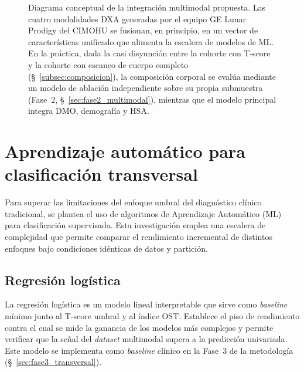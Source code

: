 \documentclass[../tesis.tex]{subfiles}
\begin{document}
\begin{figure}[h]
\caption[Diagrama conceptual de la integración multimodal propuesta]{Diagrama conceptual de la integración multimodal propuesta. Las cuatro modalidades DXA generadas por el equipo GE Lunar Prodigy del CIMOHU se fusionan, en principio, en un vector de características unificado que alimenta la escalera de modelos de ML. En la práctica, dada la casi disyunción entre la cohorte con T-score y la cohorte con escaneo de cuerpo completo (§~\ref{subsec:composicion}), la composición corporal se evalúa mediante un modelo de ablación independiente sobre su propia submuestra (Fase~2, §~\ref{sec:fase2_multimodal}), mientras que el modelo principal integra DMO, demografía y HSA.}
\label{fig:multimodal}
\end{figure}

\section{Aprendizaje automático para clasificación transversal}
\label{sec:ml_transversal}

Para superar las limitaciones del enfoque umbral del diagnóstico clínico tradicional, se plantea
el uso de algoritmos de Aprendizaje Automático (ML) para clasificación supervisada.
Esta investigación emplea una escalera de complejidad que permite comparar el rendimiento
incremental de distintos enfoques bajo condiciones idénticas de datos y partición.

\subsection{Regresión logística}
\label{subsec:logistic}

La regresión logística es un modelo lineal interpretable que sirve como \textit{baseline} mínimo
junto al T-score umbral y al índice OST\@.
Establece el piso de rendimiento contra el cual se mide la ganancia de los modelos más complejos y
permite verificar que la señal del \textit{dataset} multimodal supera a la predicción univariada.
Este modelo se implementa como \textit{baseline} clínico en la Fase~3 de la metodología
(§~\ref{sec:fase3_transversal}).
\end{document}

